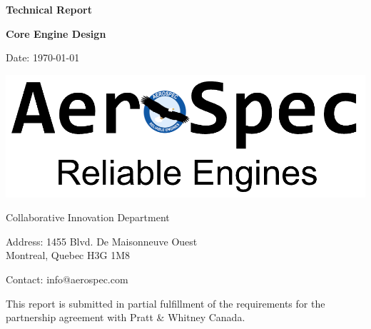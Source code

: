 \begin{titlepage}
    \centering
    \vspace*{2cm}
    {\LARGE \textbf{Technical Report}}\par
    \vspace{2cm}
    {\Huge \textbf{Core Engine Design}}\par
\vspace{2cm}
    {\Large Date: \today}\par
    \vspace{2cm}


    \begin{center}
\includegraphics[scale=0.25]{figures/named_logo.png}
\end{center}
    \vspace{0.5cm}
    {\large Collaborative Innovation Department}\par
    \vspace{0.5cm}
    {\large Address: 1455 Blvd. De Maisonneuve Ouest\\
     Montreal, Quebec H3G 1M8}\par
    \vspace{0.5cm}
    {\large Contact: info@aerospec.com}\par
    \vfill
    \vspace{1cm}
    {\small This report is submitted in partial fulfillment of the requirements for the partnership agreement with Pratt \& Whitney Canada.}
\end{titlepage}

\clearpage
